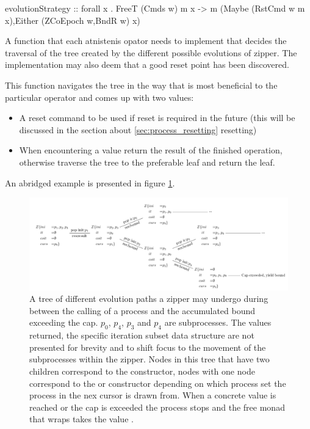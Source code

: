 \begin{code}
\begin{haskellcode}
evolutionStrategy
  :: forall x .
  FreeT (Cmds w) m x
  -> m (Maybe (RstCmd w m x),Either (ZCoEpoch w,BndR w) x)
\end{haskellcode}
  \caption{\label{lst:evolution_strategy}A function that each
    atnistenis opator needs to implement that decides the traversal of
    the tree created by the different possible evolutions of
    zipper. The implementation may also deem that a good reset point
    has been discovered.}
\end{code}

This function navigates the tree in the way that is most beneficial to
the particular operator and comes up with two values:

\begin{itemize}
\item A reset command to be used if reset is required in the future
  (this will be discussed in the section about
  \ref{sec:process_resetting} resetting)
\item When encountering a  value return the result of the
finished operation, otherwise traverse the tree to the preferable
leaf and return the leaf.
\end{itemize}

An abridged example is presented in figure \ref{fig:cmds_tree}.

\begin{figure}[p]
\centering
\includegraphics[width=\textwidth]{./imgs/cmds_tree.pdf}
\caption{\label{fig:cmds_tree}A tree of different evolution paths a
  zipper may undergo during between the calling of a process and the
  accumulated bound exceeding the cap. \(p_0\), \(p_4\), \(p_3\) and
  \(p_4\) are subprocesses. The values returned, the specific
  iteration subset data structure are not presented for brevity and to
  shift focus to the movement of the subprocesses within the
  zipper. Nodes in this tree that have two children correspond to the
   constructor, nodes with one node correspond to the
   or  constructor depending on which
  process set the process in the nex cursor is drawn from. When a
  concrete value is reached or the cap is exceeded the process stops
  and the free monad that wraps  takes the value
  .}
\end{figure}

